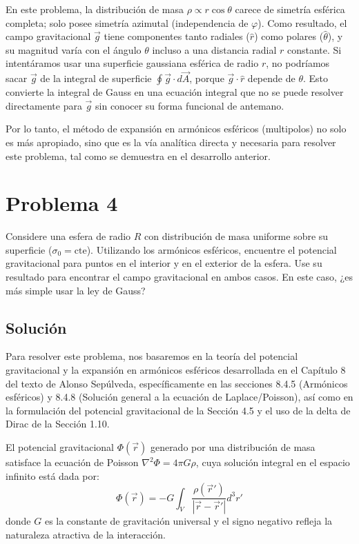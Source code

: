 \documentclass[a4paper]{article}
\begin{document}
En este problema, la distribución de masa $\rho \propto r \cos\theta$ carece de simetría esférica completa; solo posee simetría azimutal (independencia de $\varphi$). Como resultado, el campo gravitacional $\vec{g}$ tiene componentes tanto radiales ($\hat{r}$) como polares ($\hat{\theta}$), y su magnitud varía con el ángulo $\theta$ incluso a una distancia radial $r$ constante. 
Si intentáramos usar una superficie gaussiana esférica de radio $r$, no podríamos sacar $\vec{g}$ de la integral de superficie $\oint \vec{g} \cdot d\vec{A}$, porque $\vec{g} \cdot \hat{r}$ depende de $\theta$. Esto convierte la integral de Gauss en una ecuación integral que no se puede resolver directamente para $\vec{g}$ sin conocer su forma funcional de antemano. 

Por lo tanto, el método de expansión en armónicos esféricos (multipolos) no solo es más apropiado, sino que es la vía analítica directa y necesaria para resolver este problema, tal como se demuestra en el desarrollo anterior.

\section{Problema 4}
Considere una esfera de radio $R$ con distribución de masa uniforme sobre su superficie ($\sigma_0 = \text{cte}$). Utilizando los armónicos esféricos, encuentre el potencial gravitacional para puntos en el interior y en el exterior de la esfera. Use su resultado para encontrar el campo gravitacional en ambos casos. En este caso, ¿es más simple usar la ley de Gauss?

\subsection{Solución}
Para resolver este problema, nos basaremos en la teoría del potencial gravitacional y la expansión en armónicos esféricos desarrollada en el Capítulo 8 del texto de Alonso Sepúlveda, específicamente en las secciones 8.4.5 (Armónicos esféricos) y 8.4.8 (Solución general a la ecuación de Laplace/Poisson), así como en la formulación del potencial gravitacional de la Sección 4.5 y el uso de la delta de Dirac de la Sección 1.10.

El potencial gravitacional $\Phi(\vec{r})$ generado por una distribución de masa satisface la ecuación de Poisson $\nabla^2 \Phi = 4\pi G \rho$, cuya solución integral en el espacio infinito está dada por:
$$
\Phi(\vec{r}) = -G \int_V \frac{\rho(\vec{r}')}{|\vec{r} - \vec{r}'|} d^3r'
$$
donde $G$ es la constante de gravitación universal y el signo negativo refleja la naturaleza atractiva de la interacción. 
\end{document}
